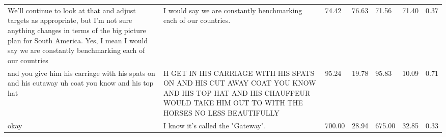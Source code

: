 \begin{table*}[ht!]
\begin{tabular}{p{5cm}p{5cm}p{1cm}p{1cm}p{1cm}p{1cm}p{1cm}}
We'll continue to look at that and adjust targets as appropriate, but I'm not sure anything changes in terms of the big picture plan for South America. Yes, I mean I would say we are constantly benchmarking each of our countries                                                               & I would say we are constantly benchmarking each of our countries.                                                                                                                                                                                                                                    & 74.42    & 76.63 & 71.56  & 71.40 & 0.37       \\
and you give him his carriage with his spats on and his cutaway uh coat you know and his top hat                                                                                                                                                                                                   & H GET IN HIS CARRIAGE WITH HIS SPATS ON AND HIS CUT AWAY COAT YOU KNOW AND HIS TOP HAT AND HIS CHAUFFEUR WOULD TAKE HIM OUT TO WITH THE HORSES NO LESS BEAUTIFULLY                                                                                                                                   & 95.24    & 19.78 & 95.83  & 10.09 & 0.71       \\
okay                                                                                                                                                                                                                                                                                               & I know it's called the "Gateway".                                                                                                                                                                                                                                                                    & 700.00   & 28.94 & 675.00 & 32.85 & 0.33       \\

\end{tabular}
\end{table*}
